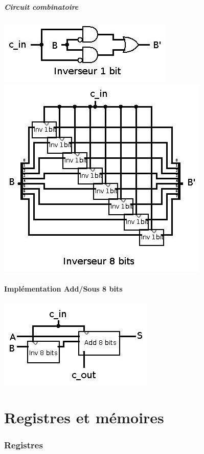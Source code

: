 \documentclass[10pt,a4paper]{article}
\begin{document}
\subsubsection{Circuit combinatoire}
\includegraphics[scale=0.5]{Inverseur1bit.jpg}\\
\includegraphics[scale=0.5]{Inverseur8bit.jpg}

\subsection{Implémentation Add/Sous 8 bits}
\includegraphics[scale=0.5]{AddSous8bits.jpg} 

\newpage
\part{Registres et mémoires}
\section{Registres}
\end{document}
